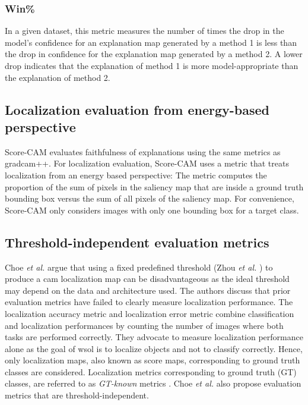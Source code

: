 \subsubsection{Win\%}
In a given dataset, this metric measures the number of times the drop in the model's confidence for an explanation map generated by a method 1 is less than the drop in confidence for the explanation map generated by a method 2. A lower drop indicates that the explanation of method 1 is more model-appropriate than the explanation of method 2.

\subsection{Localization evaluation from energy-based perspective}
Score-CAM evaluates faithfulness of explanations using the same metrics as \acrshort{gradcam}++. For localization evaluation, Score-CAM uses a metric that treats localization from an energy based perspective: The metric computes the proportion of the sum of pixels in the saliency map that are inside a ground truth bounding box versus the sum of all pixels of the saliency map. For convenience, Score-CAM only considers images with only one bounding box for a target class.

\subsection{Threshold-independent evaluation metrics}
Choe \textit{et al.} \cite{choe2020evaluating, choe2022evaluation} argue that using a fixed predefined threshold (Zhou \textit{et al.} \cite{zhou2016cvpr}) to produce a \acrshort{cam} localization map can be disadvantageous as the ideal threshold may depend on the data and architecture used. The authors discuss that prior evaluation metrics have failed to clearly measure localization performance. The localization accuracy metric \cite{russakovsky2015imagenet} and localization error metric \cite{zhou2016cvpr, selvaraju2017grad} combine classification and localization performances by counting the number of images where both tasks are performed correctly. They advocate to measure localization performance alone as the goal of \acrshort{wsol} is to localize objects and not to classify correctly. Hence, only localization maps, also known as score maps, corresponding to ground truth classes are considered. Localization metrics corresponding to ground truth (GT) classes, are referred to as \textit{GT-known} metrics \cite{choe2019attention, singh2017hide, zhang2018adversarial, zhang2018self}. Choe \textit{et al.} also propose evaluation metrics that are threshold-independent.

